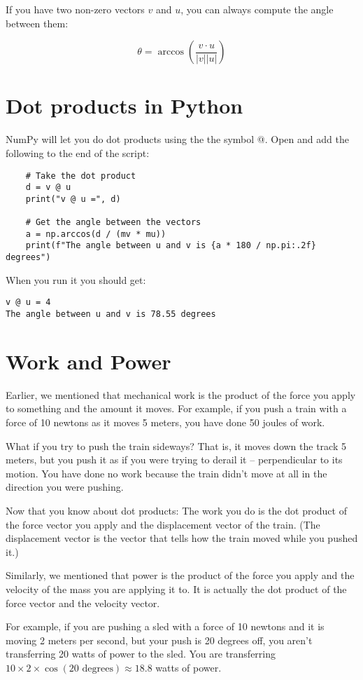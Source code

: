 If you have two non-zero vectors $v$ and $u$, you can always compute the angle between them:

$$\theta = \arccos(\frac{v \cdot u}{|v| |u|})$$
\section{Dot products in Python}

NumPy will let you do dot products using the the symbol @.  Open  
and add the following to the end of the script:

\begin{Verbatim}
    # Take the dot product
    d = v @ u
    print("v @ u =", d)
    
    # Get the angle between the vectors
    a = np.arccos(d / (mv * mu))
    print(f"The angle between u and v is {a * 180 / np.pi:.2f} degrees")    
\end{Verbatim}

When you run it you should get:
\begin{Verbatim}
v @ u = 4
The angle between u and v is 78.55 degrees
\end{Verbatim}

\section{Work and Power}
Earlier, we mentioned that mechanical work is the product of the 
force you apply to something and the amount it moves. For example, if you 
push a train with a force of 10 newtons as it moves 5 meters, you have done 50 joules of work.

What if you try to push the train sideways? That is, it moves down the track 5 meters, 
but you push it as if you were trying to derail it -- perpendicular to its motion.  
You have done no work because the train didn't move at all in the direction you were pushing.



Now that you know about dot products: The work you do is the dot
product of the force vector you apply and the displacement vector of the train. (The displacement
vector is the vector that tells how the train moved while you pushed it.) 

Similarly, we mentioned that power is the product of the force you apply and the velocity of the
mass you are applying it to. It is actually the dot product of the force vector and the velocity vector.

For example, if you are pushing a sled with a force of 10 newtons and it is moving 2 meters per second, 
but your push is 20 degrees off, you aren't transferring 20 watts of power to the sled.  
You are transferring $10 \times 2 \times \cos(20 \text{ degrees}) \approx 18.8$ watts of power.

